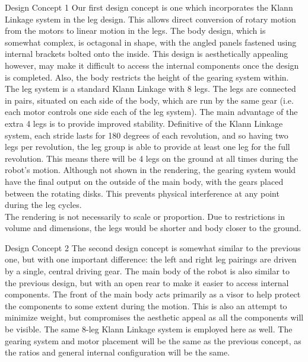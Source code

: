 \begin{homeworkProblem}
\begin{homeworkSection}{Design Concept 1}
Our first design concept is one which incorporates the Klann Linkage system in the leg design. This allows direct conversion of rotary motion from the motors to linear motion in the legs. The body design, which is somewhat complex, is octagonal in shape, with the angled panels fastened using internal brackets bolted onto the inside. This design is aesthetically appealing however, may make it difficult to access the internal components once the design is completed.  Also, the body restricts the height of the gearing system within. The leg system is a standard Klann Linkage with 8 legs. The legs are connected in pairs, situated on each side of the body, which are run by the same gear (i.e. each motor controls one side each of the leg system).  The main advantage of the extra 4 legs is to provide improved stability. Definitive of the Klann Linkage system, each stride lasts for 180 degrees of each revolution, and so having two legs per revolution, the leg group is able to provide at least one leg for the full revolution. This means there will be 4 legs on the ground at all times during the robot's motion. Although not shown in the rendering, the gearing system would have the final output on the outside of the main body, with the gears placed between the rotating disks. This prevents physical interference at any point during the leg cycles.\\

The rendering is not necessarily to scale or proportion.  Due to restrictions in volume and dimensions, the legs would be shorter and body closer to the ground.
\end{homeworkSection}

\begin{homeworkSection}{Design Concept 2}
The second design concept is somewhat similar to the previous one, but with one important difference: the left and right leg pairings are driven by a single, central driving gear. The main body of the robot is also similar to the previous design, but with an open rear to make it easier to access internal components. The front of the main body acts primarily as a visor to help protect the components to some extent during the motion. This is also an attempt to minimize weight, but compromises the aesthetic appeal as all the components will be visible. The same 8-leg Klann Linkage system is employed here as well. The gearing system and motor placement will be the same as the previous concept, as the ratios and general internal configuration will be the same.


\end{homeworkSection}
\end{homeworkProblem}
